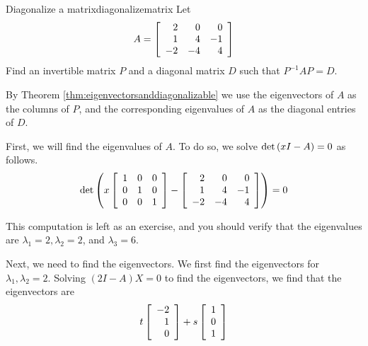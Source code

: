 \begin{example}{Diagonalize a matrix}{diagonalizematrix}
Let 
\begin{equation*}
A=\left[
\begin{array}{rrr}
2 & 0 & 0 \\
1 & 4 & -1 \\
-2 & -4 & 4
\end{array}
\right] 
\end{equation*}
 Find an invertible matrix $P$ and a diagonal matrix $D$ such that $P^{-1}AP=D$.
\end{example}

\begin{solution}
By Theorem \ref{thm:eigenvectorsanddiagonalizable} we use the eigenvectors of $A$ as the columns of $P$, and
the corresponding eigenvalues of $A$ as the diagonal entries of $D$. 

First, we will find the eigenvalues of $A$. To do so, we solve $\det \left( x I -A \right) =0$ as follows.
\begin{equation*}
\det
\left(
x
\left[
\begin{array}{rrr}
1 & 0 & 0 \\
0 & 1 & 0 \\
0 & 0 & 1
\end{array}
\right]
-
\left[
\begin{array}{rrr}
2 & 0 & 0 \\
1 & 4 & -1 \\
-2 & -4 & 4
\end{array}
\right]
\right)
=
0
\end{equation*}

This computation is left as an exercise, and you should verify that the eigenvalues are $\lambda_1 =2,
\lambda_2 = 2$, and $\lambda_3 = 6$.

Next, we need to find the eigenvectors. We first find the eigenvectors for $\lambda_1, \lambda_2 = 2$. 
Solving $\left(2I - A \right)X = 0$ to find the eigenvectors, we find that the
eigenvectors are
\begin{equation*}
t\left[
\begin{array}{r}
-2 \\
1 \\
0
\end{array}
\right] +s\left[
\begin{array}{r}
1 \\
0 \\
1
\end{array}
\right]
\end{equation*}


\end{solution}

